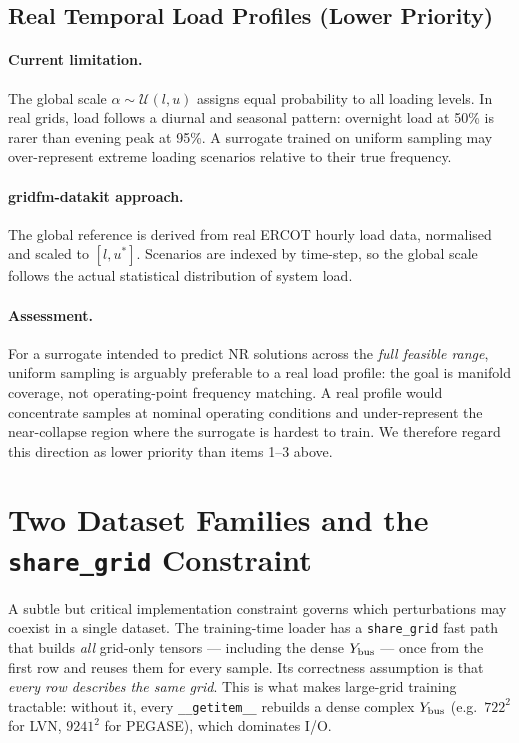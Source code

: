\documentclass{article}
\begin{document}
\subsection{Real Temporal Load Profiles (Lower Priority)}

\paragraph{Current limitation.}
The global scale $\alpha \sim \mathcal{U}(l, u)$ assigns equal probability to
all loading levels.  In real grids, load follows a diurnal and seasonal
pattern: overnight load at 50\% is rarer than evening peak at 95\%.
A surrogate trained on uniform sampling may over-represent extreme loading
scenarios relative to their true frequency.

\paragraph{gridfm-datakit approach.}
The global reference is derived from real ERCOT hourly load data, normalised
and scaled to $[l, u^*]$.  Scenarios are indexed by time-step, so the global
scale follows the actual statistical distribution of system load.

\paragraph{Assessment.}
For a surrogate intended to predict NR solutions across the \emph{full feasible
range}, uniform sampling is arguably preferable to a real load profile: the
goal is manifold coverage, not operating-point frequency matching.  A real
profile would concentrate samples at nominal operating conditions and under-represent
the near-collapse region where the surrogate is hardest to train.  We therefore
regard this direction as lower priority than items 1--3 above.

\section{Two Dataset Families and the \texttt{share\_grid} Constraint}

A subtle but critical implementation constraint governs which perturbations may
coexist in a single dataset.  The training-time loader has a \texttt{share\_grid}
fast path that builds \emph{all} grid-only tensors --- including the dense
$Y_{\rm bus}$ --- once from the first row and reuses them for every sample.  Its
correctness assumption is that \emph{every row describes the same grid}.  This
is what makes large-grid training tractable: without it, every
\texttt{\_\_getitem\_\_} rebuilds a dense complex $Y_{\rm bus}$ (e.g.\ $722^2$
for LVN, $9241^2$ for PEGASE), which dominates I/O.
\end{document}
